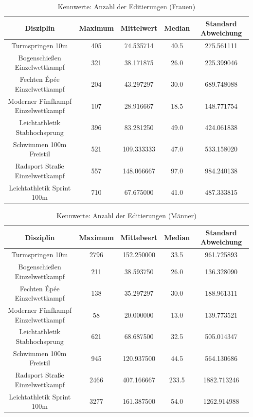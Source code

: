 \documentclass[11pt]{article}
\begin{document}
\begin{table}
\centering
\begin{tabular}{ c|c|c|c|c }
  Disziplin & Maximum & Mittelwert & Median & Standard Abweichung \\
  \hline
  Turmspringen 10m & 405 & 74.535714 & 40.5 & 275.561111 \\
  Bogenschießen Einzelwettkampf & 321 & 38.171875 & 26.0 & 225.399046 \\
  Fechten Épée Einzelwettkampf & 204 & 43.297297 & 30.0 & 689.748088 \\
  Moderner Fünfkampf Einzelwettkampf & 107 & 28.916667 & 18.5 & 148.771754 \\
  Leichtathletik Stabhochsprung & 396 & 83.281250 & 49.0 & 424.061838\\
  Schwimmen 100m Freistil & 521 & 109.333333 & 47.0 & 533.158020\\
  Radsport Straße Einzelwettkampf & 557 & 148.066667 & 97.0 & 984.240138\\
  Leichtathletik Sprint 100m & 710 & 67.675000 & 41.0 & 487.333815\\
\end{tabular}
\caption{\label{tab:editcount_kpi_women}Kennwerte: Anzahl der Editierungen (Frauen)}
\end{table}

\begin{table}
\centering
\begin{tabular}{ c|c|c|c|c }
  Disziplin & Maximum & Mittelwert & Median & Standard Abweichung \\
  \hline
  Turmspringen 10m & 2796 & 152.250000 & 33.5 & 961.725893 \\
  Bogenschießen Einzelwettkampf & 211 & 38.593750 & 26.0 & 136.328090\\
  Fechten Épée Einzelwettkampf & 138 & 35.297297 & 30.0 & 188.961311 \\
  Moderner Fünfkampf Einzelwettkampf & 58 & 20.000000 & 13.0 & 139.773521\\
  Leichtathletik Stabhochsprung & 621 & 68.687500 & 32.5 & 505.014347\\
  Schwimmen 100m Freistil & 945 & 120.937500 & 44.5 & 564.130686\\
  Radsport Straße Einzelwettkampf & 2466 & 407.166667 & 233.5 & 1882.713246\\
  Leichtathletik Sprint 100m & 3277 & 161.387500 & 54.0 & 1262.914988\\
\end{tabular}
\caption{\label{tab:editcount_kpi_men}Kennwerte: Anzahl der Editierungen (Männer)}
\end{table}
\end{document}
